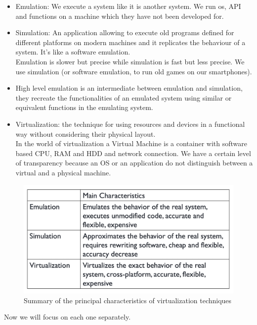 \begin{itemize}
    \item Emulation: We execute a system like it is another system. We run os, API and functions on a machine which they have not been developed for.
    \item Simulation: An application allowing to execute old programs defined for different platforms on modern machines and it replicates the behaviour of a system. It's like a software emulation. \\
    Emulation is slower but precise while simulation is fast but less precise. We use simulation (or software emulation, to run old games on our smartphones).
    \item High level emulation is an intermediate between emulation and simulation, they recreate the functionalities of an emulated system using similar or equivalent functions in the emulating system.
    \item Virtualization: the technique for using resources and devices in a functional way without considering their physical layout. \\
    In the world of virtualization a Virtual Machine is a container with software based CPU, RAM and HDD and network connection. We have a certain level of transparency because an OS or an application do not distinguish between a virtual and a physical machine.
\end{itemize}
\begin{figure}
    \centering
    \includegraphics[scale=0.4]{./Images/summary_virtualization.png}
    \caption{Summary of the principal characteristics of virtualization techniques}
\end{figure}
Now we will focus on each one separately.
